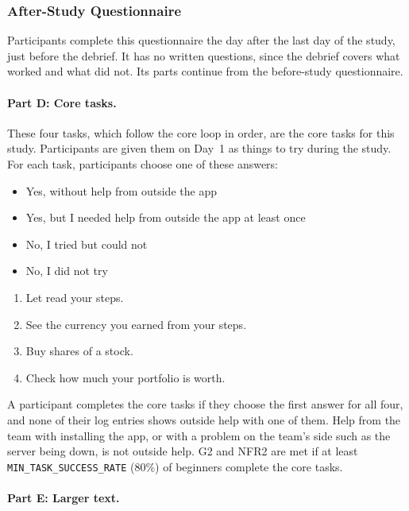 \documentclass[12pt, titlepage]{article}
\makeatletter
\newenvironment{choices}
  {\interlinepenalty=10000 \@beginparpenalty=10000
   \begin{itemize}\@itempenalty=10000}
  {\end{itemize}}
\makeatother
\begin{document}
\subsubsection{After-Study Questionnaire} \label{SecAfterStudy}

Participants complete this questionnaire the day after the last day of the
study, just before the debrief. It has no written questions, since the debrief
covers what worked and what did not. Its parts continue from the before-study
questionnaire.

\paragraph{Part D: Core tasks.}

These four tasks, which follow the core loop in order, are the core tasks for
this study. Participants are given them on Day~1 as things to try during the
study. For each task, participants choose one of these answers:

\begin{choices}
  \item[$\circ$] Yes, without help from outside the app
  \item[$\circ$] Yes, but I needed help from outside the app at least once
  \item[$\circ$] No, I tried but could not
  \item[$\circ$] No, I did not try
\end{choices}

{\renewcommand{\labelenumi}{D\arabic{enumi}.}
\renewcommand{\theenumi}{D\arabic{enumi}}
\begin{enumerate}
  \item Let \progname{} read your steps.
  \item See the currency you earned from your steps.
  \item Buy shares of a stock.
  \item Check how much your portfolio is worth.
\end{enumerate}}

A participant completes the core tasks if they choose the first answer for all
four, and none of their log entries shows outside help with one of them. Help
from the team with installing the app, or with a problem on the team's side
such as the server being down, is not outside help. G2 and NFR2 are met if at
least \texttt{MIN\_TASK\_SUCCESS\_RATE} (80\%) of beginners complete the core
tasks.

\paragraph{Part E: Larger text.}
\end{document}

